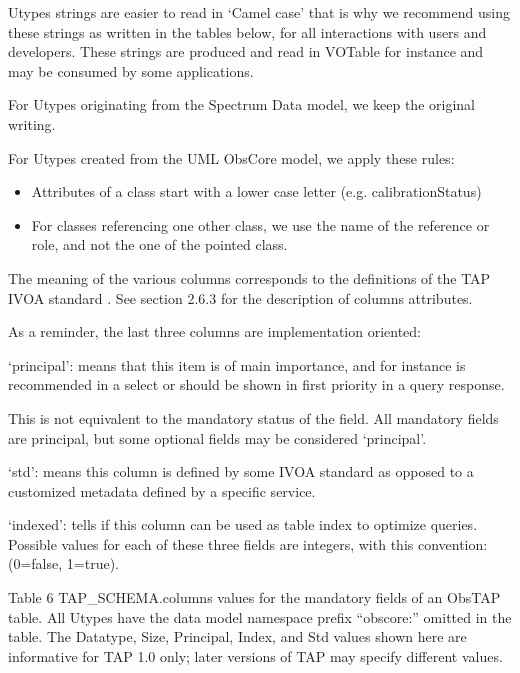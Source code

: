 \documentclass[11pt,a4paper]{ivoa}
\begin{document}
Utypes strings are easier to read in `Camel case' that is why we recommend using these strings as written in the tables
below, for all interactions with users and developers. These strings are produced and read in VOTable for instance and
may be consumed by some applications.

For Utypes originating from the Spectrum Data model, we keep the original writing.

For Utypes created from the UML ObsCore model, we apply these rules:

\begin{itemize}
\item Attributes of a class start with a lower case letter (e.g. calibrationStatus)
\item For classes referencing one other class, we use the name of the reference or role, and not the one of the pointed
class. 
\end{itemize}
The meaning of the various columns corresponds to the definitions of the TAP IVOA standard \citep{2010ivoa.spec.0327D}. See
section 2.6.3 for the description of columns attributes.

As a reminder, the last three columns are implementation oriented: 

{}`principal': means that this item is of main importance, and for instance is recommended in a select or should be
shown in first priority in a query response.

This is not equivalent to the mandatory status of the field. All mandatory fields are principal, but some optional
fields may be considered `principal'.

{}`std': means this column is defined by some IVOA standard as opposed to a customized metadata defined by a specific
service.

{}`indexed': tells if this column can be used as table index to optimize queries. Possible values for each of these
three fields are integers, with this convention: (0=false, 1=true).

Table  6  TAP\_SCHEMA.columns values for the mandatory fields of an ObsTAP table. All Utypes have the data model
namespace prefix {}``obscore:'' omitted in the table. The Datatype, Size, Principal, Index, and Std values shown here
are informative for TAP 1.0 only; later versions of TAP may specify different values.
\end{document}
